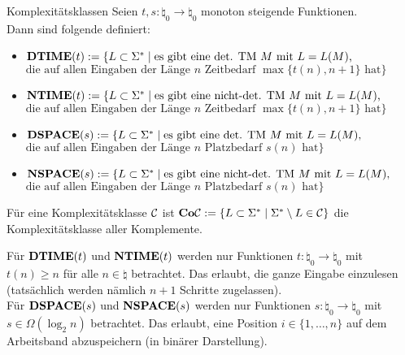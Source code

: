 \begin{Def}{Komplexitätsklassen}
    Seien $t, s\colon \natural_0 \rightarrow \natural_0$ monoton steigende Funktionen.\\
    Dann sind folgende  definiert:
    \begin{itemize}
        \item
        $\mathbf{DTIME}(t) := \{L \subset \Sigma^\ast \;|\;
        \text{es gibt eine det. TM } M \text{ mit } L = L(M) \text{,}$\\
        $\text{die auf allen Eingaben der Länge }
        n \text{ Zeitbedarf } \max\{t(n), n + 1\} \text{ hat}\}$
        
        \item
        $\mathbf{NTIME}(t) := \{L \subset \Sigma^\ast \;|\;
        \text{es gibt eine nicht-det. TM } M \text{ mit } L = L(M) \text{,}$\\
        $\text{die auf allen Eingaben der Länge }
        n \text{ Zeitbedarf } \max\{t(n), n + 1\} \text{ hat}\}$
        
        \item
        $\mathbf{DSPACE}(s) := \{L \subset \Sigma^\ast \;|\;
        \text{es gibt eine det. TM } M \text{ mit } L = L(M) \text{,}$\\
        $\text{die auf allen Eingaben der Länge }
        n \text{ Platzbedarf } s(n) \text{ hat}\}$
        
        \item
        $\mathbf{NSPACE}(s) := \{L \subset \Sigma^\ast \;|\;
        \text{es gibt eine nicht-det. TM } M \text{ mit } L = L(M) \text{,}$\\
        $\text{die auf allen Eingaben der Länge }
        n \text{ Platzbedarf } s(n) \text{ hat}\}$
    \end{itemize}
    Für eine Komplexitätsklasse $\mathcal{C}$ ist
    $\mathbf{Co}\mathcal{C} := \{L \subset \Sigma^\ast \;|\; \Sigma^\ast \setminus L \in \mathcal{C}\}$
    die Komplexitätsklasse aller Komplemente.
\end{Def}

\begin{Bem}
    Für $\mathbf{DTIME}(t)$ und $\mathbf{NTIME}(t)$ werden nur Funktionen
    $t\colon \natural_0 \rightarrow \natural_0$
    mit $t(n) \ge n$ für alle $n \in \natural$ betrachtet.
    Das erlaubt, die ganze Eingabe einzulesen
    (tatsächlich werden nämlich $n + 1$ Schritte zugelassen).\\
    Für $\mathbf{DSPACE}(s)$ und $\mathbf{NSPACE}(s)$ werden nur Funktionen
    $s\colon \natural_0 \rightarrow \natural_0$ mit $s \in \Omega(\log_2 n)$ betrachtet.
    Das erlaubt, eine Position $i \in \{1, \dotsc, n\}$ auf dem Arbeitsband abzuspeichern
    (in binärer Darstellung).
\end{Bem}

